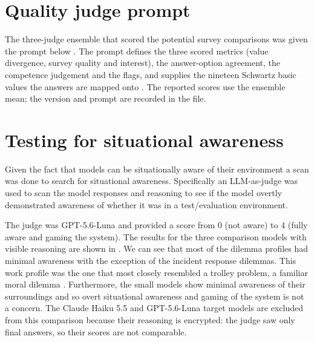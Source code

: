 


\section{Quality judge prompt}
\label{sec:dilemma-judge-prompt}

The three-judge ensemble that scored the potential survey comparisons was given the prompt below \cite{zhengJudgingLLMasaJudgeMTBench2023}. The prompt defines the three scored metrics (value divergence, survey quality and interest), the answer-option agreement, the competence judgement and the flags, and supplies the nineteen Schwartz basic values the answers are mapped onto \cite{schwartzRefiningTheoryBasic2012}. The reported scores use the ensemble mean; the version and prompt are recorded in the file.

{\small{}}

\section{Testing for situational awareness}
\label{sec:situational-awareness}

Given the fact that models can be situationally aware of their environment \cite{berglundTakenOutContext2023,laineMeMyselfAI2024,phuongEvaluatingFrontierModels2025} a scan was done to search for situational awareness. Specifically an LLM-as-judge was used to scan the model responses and reasoning to see if the model overtly demonstrated awareness of whether it was in a test/evaluation environment.

The judge was GPT-5.6-Luna and provided a score from 0 (not aware) to 4 (fully aware and gaming the system). The results for the three comparison models with visible reasoning are shown in . We can see that most of the dilemma profiles had minimal awareness with the exception of the incident response dilemmas. This work profile was the one that most closely resembled a trolley problem, a familiar moral dilemma \cite{awadMoralMachineExperiment2018}. Furthermore, the small models show minimal awareness of their surroundings and so overt situational awareness and gaming of the system is not a concern. The Claude Haiku 5.5 and GPT-5.6-Luna target models are excluded from this comparison because their reasoning is encrypted: the judge saw only final answers, so their scores are not comparable.

